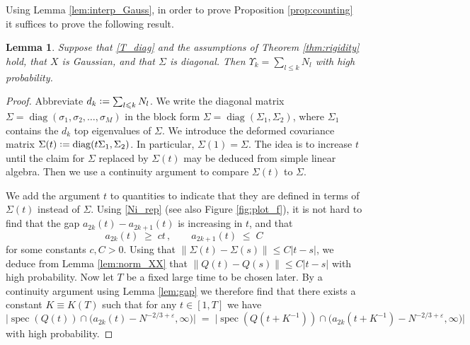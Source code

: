 \documentclass[11pt]{article} %
\numberwithin{equation}{section}
\numberwithin{figure}{section}
\theoremstyle{plain} %
\newtheorem{lemma}[theorem]{Lemma}
\theoremstyle{definition} %
\newcommand*{\deq}{\mathrel{\vcenter{\baselineskip0.65ex \lineskiplimit0pt \hbox{.}\hbox{.}}}=}
\renewcommand{\leq}{\leqslant}
\renewcommand{\geq}{\geqslant}
\renewcommand{\epsilon}{\varepsilon}
\newcommand{\pb}[1]{\bigl({#1}\bigr)}
\newcommand{\abs}[1]{\lvert #1 \rvert}
\newcommand{\absb}[1]{\bigl\lvert #1 \bigr\rvert}
\newcommand{\norm}[1]{\lVert #1 \rVert}
\DeclareMathOperator{\diag}{diag}
\DeclareMathOperator{\spec}{spec}
\begin{document}
Using Lemma \ref{lem:interp_Gauss}, in order to prove Proposition \ref{prop:counting} it suffices to prove the following result.

\begin{lemma} \label{lem:Gaussian counting}
Suppose that \eqref{T_diag} and the assumptions of Theorem \ref{thm:rigidity} hold, that $X$ is Gaussian, and that $\Sigma$ is diagonal. Then $\Upsilon_k = \sum_{l \leq k} N_l$ with high probability.
\end{lemma}

\begin{proof}
Abbreviate $d_k \deq \sum_{l \leq k} N_l$.
We write the diagonal matrix $\Sigma = \diag(\sigma_1, \sigma_2, \dots, \sigma_M)$ in the block form $\Sigma = \diag(\Sigma_1, \Sigma_2)$, where $\Sigma_1$ contains the $d_k$ top eigenvalues of $\Sigma$. We introduce the deformed covariance matrix $\Sigma(t) \deq \diag (t \Sigma_1, \Sigma_2)$. In particular, $\Sigma(1) = \Sigma$. The idea is to increase $t$ until the claim for $\Sigma$ replaced by $\Sigma(t)$ may be deduced from simple linear algebra. Then we use a continuity argument to compare $\Sigma(t)$ to $\Sigma$.

We add the argument $t$ to quantities to indicate that they are defined in terms of $\Sigma(t)$ instead of $\Sigma$. Using \eqref{Ni_rep} (see also Figure \ref{fig:plot_f}), it is not hard to find that the gap $a_{2k}(t) - a_{2k+1}(t)$ is increasing in $t$, and that
\begin{equation}
a_{2k}(t) \;\geq\; ct \,, \qquad a_{2k+1}(t) \;\leq\; C
\end{equation}
for some constants $c,C > 0$. Using that $\norm{\Sigma(t) - \Sigma(s)} \leq C \abs{t - s}$, we deduce from Lemma \ref{lem:norm_XX} that $\norm{Q(t) - Q(s)} \leq C \abs{t - s}$ with high probability. Now let $T$ be a fixed large time to be chosen later. By a continuity argument using Lemma \ref{lem:gap} we therefore find that there exists a constant $K \equiv K(T)$ such that for any $t \in [1,T]$ we have
\begin{equation} \label{deformation_arg}
\absb{\spec(Q(t)) \cap \pb{a_{2k}(t) - N^{-2/3 + \epsilon}, \infty}} \;=\; \absb{\spec(Q(t + K^{-1})) \cap \pb{a_{2k}(t + K^{-1}) - N^{-2/3 + \epsilon}, \infty}}
\end{equation}
with high probability.


\end{proof}
\end{document}
